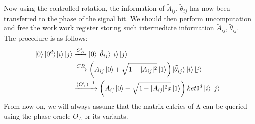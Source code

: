 \documentclass[12pt, oneside]{book}
\theoremstyle{definition}
\theoremstyle{definition}
\theoremstyle{remark}
\begin{document}
Now using the controlled rotation, the information of $\tilde{A}_{ij}$, $\tilde{\theta}_{ij}$ has now been transferred to the phase of the signal bit. We should then perform uncomputation and free the work work register storing such intermediate information $\tilde{A}_{ij}$, $\tilde{\theta}_{ij}$. The procedure is as follows:
\begin{align*}
\ket{0}\ket{0^d}\ket{i}\ket{j}&\xrightarrow{O'_A}\ket{0}\ket{\tilde{\theta}_{ij}}\ket{i}\ket{j}\\
&\xrightarrow{CR}\left(A_{ij}\ket{0}+\sqrt{1-|A_{ij}|^2}\ket{1}\right)\ket{\tilde{\theta}_{ij}}\ket{i}\ket{j}\\
&\xrightarrow{(O'_A)^{-1}}\left(A_{ij}\ket{0}+\sqrt{1-|A_{ij}|^2x}\ket{1}\right)ket{0^d}\ket{i}\ket{j}
\end{align*}
From now on, we will always assume that the matrix entries of A can be queried using the phase oracle $O_A$ or its variants.
\end{document}
